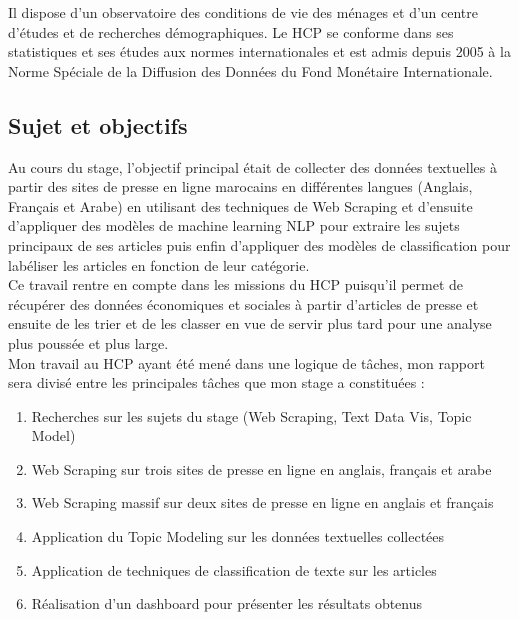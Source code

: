 \documentclass[a4paper,french,12pt]{article}
\begin{document}
Il dispose d’un observatoire des conditions de vie des ménages et d’un centre d’études et de recherches démographiques. Le HCP se conforme dans ses statistiques et ses études aux normes internationales et est admis depuis 2005 à la Norme Spéciale de la Diffusion des Données du Fond Monétaire Internationale.

\subsection{Sujet et objectifs}

Au cours du stage, l'objectif principal était de collecter des données textuelles à partir des sites de presse en ligne marocains en différentes langues (Anglais, Français et Arabe) en utilisant des techniques de Web Scraping et d'ensuite d'appliquer des modèles de machine learning NLP pour extraire les sujets principaux de ses articles puis enfin d'appliquer des modèles de classification pour labéliser les articles en fonction de leur catégorie.\\

Ce travail rentre en compte dans les missions du HCP puisqu'il permet de récupérer des données économiques et sociales à partir d'articles de presse et ensuite de les trier et de les classer en vue de servir plus tard pour une analyse plus poussée et plus large.\\

Mon travail au HCP ayant été mené dans une logique de tâches, mon rapport sera divisé entre les principales tâches que mon stage a constituées :\\
\begin{enumerate}
    \item Recherches sur les sujets du stage (Web Scraping, Text Data Vis, Topic Model)
    \item Web Scraping sur trois sites de presse en ligne en anglais, français et arabe
    \item Web Scraping massif sur deux sites de presse en ligne en anglais et français
    \item Application du Topic Modeling sur les données textuelles collectées
    \item Application de techniques de classification de texte sur les articles
    \item Réalisation d'un dashboard pour présenter les résultats obtenus\\
\end{enumerate}

\newpage
\end{document}
